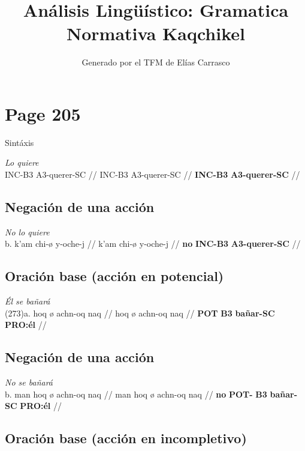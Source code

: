 \documentclass{article}%
\title{Análisis Lingüístico: Gramatica Normativa Kaqchikel}%
\author{Generado por el TFM de Elías Carrasco}%
\begin{document}
%
\normalsize%
\maketitle%
\section{Page 205}%
\label{sec:Page205}%
Sintáxis %
\par\medskip%
\ex
\textit{Lo quiere} \\
\begingl
\gla INC-B3 A3-querer-SC //
\glb INC-B3 A3-querer-SC //
\glc \textbf{INC-}\textbf{B3} \textbf{A3-}\textbf{querer-}\textbf{SC} //
\endgl
\xe
%
\medskip%
\subsection{Negación de una acción}%
\label{subsec:Negacindeunaaccin}%

%
\par\medskip%
\ex
\textit{No lo quiere} \\
\begingl
\gla b. k’am chi-ø y-oche-j //
\glb k’am chi-ø y-oche-j //
\glc \textbf{no} \textbf{INC-}\textbf{B3} \textbf{A3-}\textbf{querer-}\textbf{SC} //
\endgl
\xe
%
\medskip%
\subsection{Oración base (acción en potencial)}%
\label{subsec:Oracinbase(accinenpotencial)}%

%
\par\medskip%
\ex
\textit{Él se bañará} \\
\begingl
\gla (273)a. hoq ø achn-oq naq //
\glb hoq ø achn-oq naq //
\glc \textbf{POT} \textbf{B3} \textbf{bañar-}\textbf{SC} \textbf{PRO:él} //
\endgl
\xe
%
\medskip%
\subsection{Negación de una acción}%
\label{subsec:Negacindeunaaccin}%

%
\par\medskip%
\ex
\textit{No se bañará} \\
\begingl
\gla b. man hoq ø achn-oq naq //
\glb man hoq ø achn-oq naq //
\glc \textbf{no} \textbf{POT-} \textbf{B3} \textbf{bañar-}\textbf{SC} \textbf{PRO:él} //
\endgl
\xe
%
\medskip%
\subsection{Oración base (acción en incompletivo)}%
\label{subsec:Oracinbase(accinenincompletivo)}%
\end{document}
